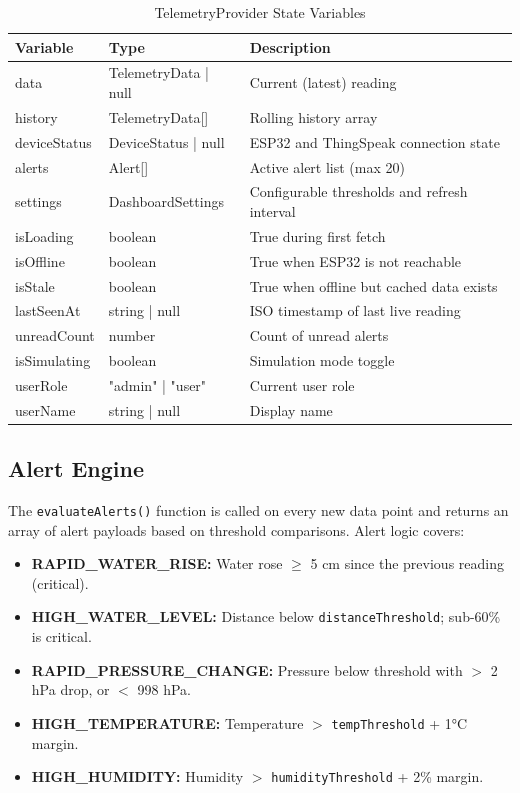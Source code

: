 \begin{table}[H]
\centering
\caption{TelemetryProvider State Variables}
\begin{tabularx}{\linewidth}{|l|l|X|}
\hline
\rowcolor{FloodLight}
\textbf{Variable} & \textbf{Type} & \textbf{Description} \\
\hline
data & TelemetryData | null & Current (latest) reading \\
history & TelemetryData[] & Rolling history array \\
deviceStatus & DeviceStatus | null & ESP32 and ThingSpeak connection state \\
alerts & Alert[] & Active alert list (max 20) \\
settings & DashboardSettings & Configurable thresholds and refresh interval \\
isLoading & boolean & True during first fetch \\
isOffline & boolean & True when ESP32 is not reachable \\
isStale & boolean & True when offline but cached data exists \\
lastSeenAt & string | null & ISO timestamp of last live reading \\
unreadCount & number & Count of unread alerts \\
isSimulating & boolean & Simulation mode toggle \\
userRole & "admin" | "user" & Current user role \\
userName & string | null & Display name \\
\hline
\end{tabularx}
\end{table}

\subsection{Alert Engine}

The \texttt{evaluateAlerts()} function is called on every new data point and returns an array of alert payloads based on threshold comparisons. Alert logic covers:

\begin{itemize}[leftmargin=1.5em]
  \item \textbf{RAPID\_WATER\_RISE:} Water rose $\geq$ 5 cm since the previous reading (critical).
  \item \textbf{HIGH\_WATER\_LEVEL:} Distance below \texttt{distanceThreshold}; sub-60\% is critical.
  \item \textbf{RAPID\_PRESSURE\_CHANGE:} Pressure below threshold with $>$ 2 hPa drop, or $<$ 998 hPa.
  \item \textbf{HIGH\_TEMPERATURE:} Temperature $>$ \texttt{tempThreshold} + 1°C margin.
  \item \textbf{HIGH\_HUMIDITY:} Humidity $>$ \texttt{humidityThreshold} + 2\% margin.
\end{itemize}


